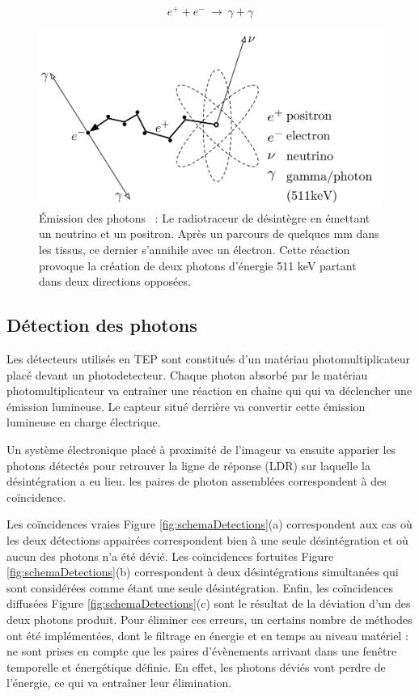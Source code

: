 \begin{equation}
 e^+ + e^-~\rightarrow~\gamma + \gamma
\label{eq:annihilation}
\end{equation}

\begin{figure}
\centering
\includegraphics[width=12cm]{images/annihilation}
\caption[\'Emission des photons]{\'Emission des photons~\cite{Langner2008ad} : Le radiotraceur de désintègre en émettant un neutrino et un positron. Après un parcours de quelques mm dans les tissus, ce dernier s'annihile avec un électron. Cette réaction provoque la création de deux photons d'énergie 511 keV partant dans deux directions opposées.}
\label{fig:Langner2008ad}
\end{figure}

	\subsection{Détection des photons}

Les détecteurs utilisés en TEP sont constitués d'un matériau photomultiplicateur placé devant un photodetecteur. Chaque photon absorbé par le matériau photomultiplicateur va entraîner une réaction en chaîne qui qui va déclencher une émission lumineuse. Le capteur situé derrière va convertir cette émission lumineuse en charge électrique.

Un système électronique placé à proximité de l'imageur va ensuite apparier les photons détectés pour retrouver la ligne de réponse (LDR) sur laquelle la désintégration a eu lieu. les paires de photon assemblées correspondent à des coïncidence.

Les coïncidences vraies Figure \ref{fig:schemaDetections}(a) correspondent aux cas où les deux détections appairées correspondent bien à une seule désintégration et où aucun des photons n'a été dévié. Les coïncidences fortuites Figure \ref{fig:schemaDetections}(b) correspondent à deux désintégrations simultanées qui sont considérées comme étant une seule désintégration. Enfin, les coïncidences diffusées Figure \ref{fig:schemaDetections}(c) sont le résultat de la déviation d'un des deux photons produit. Pour éliminer ces erreurs, un certains nombre de méthodes ont été implémentées, dont le filtrage en énergie et en temps au niveau matériel : ne sont prises en compte que les paires d'évènements arrivant dans une fenêtre temporelle et énergétique définie. En effet, les photons déviés vont perdre de l'énergie, ce qui va entraîner leur élimination.

